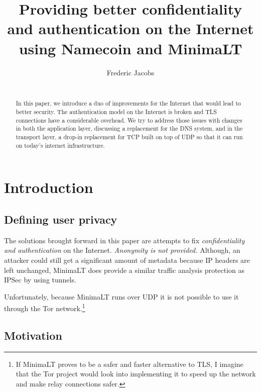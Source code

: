 \documentclass{vldb}
\begin{document}
\title{Providing better confidentiality and authentication on the Internet using Namecoin and MinimaLT}

\author{
\alignauthor
Frederic Jacobs\\
\\
}

\maketitle

\begin{abstract}
In this paper, we introduce a duo of improvements for the Internet that would lead to better security. The authentication model on the Internet is broken and TLS connections have a considerable overhead. We try to address those issues with changes in both the application layer, discussing a replacement for the DNS system, and in the transport layer, a drop-in replacement for TCP built on top of UDP so that it can run on today's internet infrastructure.

\end{abstract}

\section{Introduction}

\subsection{Defining user privacy}

The solutions brought forward in this paper are attempts to fix \emph{confidentiality and authentication} on the Internet. \emph{Anonymity is not provided.} Although, an attacker could still get a significant amount of metadata because IP headers are left unchanged, MinimaLT does provide a similar traffic analysis protection as IPSec by using tunnels.

Unfortunately, because MinimaLT runs over UDP it is not possible to use it through the Tor network.\footnote{If MinimaLT proves to be a safer and faster alternative to TLS, I imagine that the Tor project would look into implementing it to speed up the network and make relay connections safer.}

\subsection{Motivation}
\end{document}
